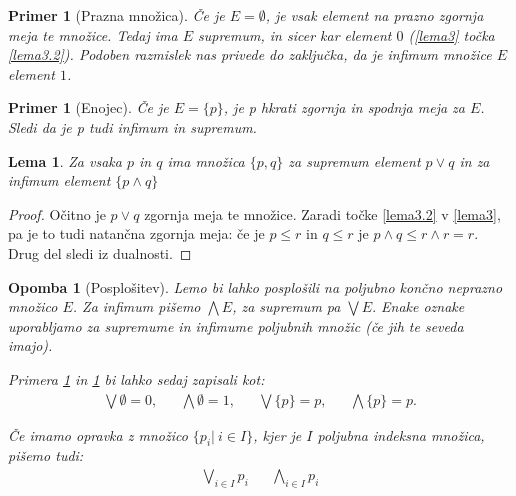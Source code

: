 \documentclass{amsart}
\newtheorem{lema}[izrek]{Lema}
\newtheorem{opomba}[izrek]{Opomba}
\newtheorem{primer}[izrek]{Primer}
\begin{document}
\begin{primer}[Prazna množica]
    \label{primer1}
    Če je \(E = \emptyset\), je vsak element na prazno zgornja meja te množice. Tedaj ima \(E\) supremum, in sicer kar element \(0\)
    (\ref{lema3} točka \ref{lema3.2}). 
    Podoben razmislek nas privede do zaključka, da je infimum množice \(E\) element \(1\).
\end{primer}

\begin{primer}[Enojec]
    \label{primer2}
    Če je \(E = \{p\}\), je p hkrati zgornja in spodnja meja za \(E\). Sledi da je p tudi infimum in supremum.
\end{primer}

\begin{lema}
    Za vsaka \(p\) in \(q\) ima množica \(\{p, q\}\) za supremum element \(p \vee q\) in za infimum element \(\{p \wedge q\}\)
\end{lema}

\begin{proof}
    Očitno je \(p \vee q\) zgornja meja te množice. Zaradi točke \ref{lema3.2} v \ref{lema3}, pa je to tudi natančna zgornja meja:
    če je $p \leq r$ in $q \leq r$ je $p \wedge q \leq r \wedge r = r$.
    Drug del sledi iz dualnosti.

\end{proof}

\begin{opomba}[Posplošitev]
    Lemo bi lahko posplošili na poljubno končno neprazno množico \(E\). Za infimum pišemo \(\bigwedge E\), za supremum pa
    \(\bigvee E.\) Enake oznake uporabljamo za supremume in infimume poljubnih množic (če jih te seveda imajo).

    Primera \ref{primer1} in \ref{primer2} bi lahko sedaj zapisali kot:
    \begin{align*}
        \bigvee \emptyset = 0, && \bigwedge \emptyset = 1, && \bigvee \{p\} = p, && \bigwedge \{p\} = p.
    \end{align*}

    Če imamo opravka z množico \(\{p_i|~i \in I\}\), kjer je $I$ poljubna indeksna množica, pišemo tudi:
    \begin{align*}
        \bigvee_{i \in I} p_i && \bigwedge_{i \in I} p_i
    \end{align*}
\end{opomba}

\end{document}
